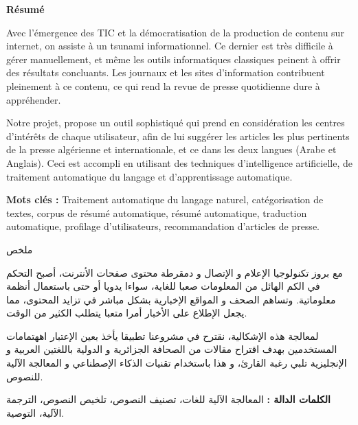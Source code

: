 \begin{center}
    \Large 
    \textbf{Résumé}
\end{center}

Avec l'émergence des TIC et la démocratisation de la production de contenu sur internet, on assiste à un tsunami informationnel. Ce dernier est très difficile à gérer manuellement, et même les outils informatiques classiques peinent à offrir des résultats concluants. Les journaux et les sites d'information contribuent pleinement à ce contenu, ce qui rend la revue de presse quotidienne dure à appréhender. 

Notre projet, propose un outil sophistiqué qui prend en considération les centres d’intérêts de chaque utilisateur, afin de lui suggérer les articles les plus pertinents de la presse algérienne et internationale, et ce dans les deux langues (Arabe et Anglais). Ceci est accompli en utilisant des techniques d'intelligence artificielle, de traitement automatique du langage et d'apprentissage automatique. 

\noindent
\textbf{Mots clés :} Traitement automatique du langage naturel, catégorisation de textes, corpus de résumé
automatique, résumé automatique, traduction automatique, profilage d'utilisateurs, recommandation d'articles de presse.  

\vspace*{0.8cm}

\begin{center}
    \Large 
    \begin{arab}
    ملخص
    \end{arab}
\end{center}
\begin{arab}
مع بروز تكنولوجيا الإعلام و الإتصال و دمقرطة محتوى صفحات الأنترنت، أصبح التحكم في الكم الهائل من المعلومات صعبا للغاية، سواءا يدويا أو حتى باستعمال أنظمة معلوماتية. وتساهم الصحف و المواقع الإخبارية بشكل مباشر في تزايد المحتوى، مما يجعل الإطلاع على الأخبار أمرا متعبا يتطلب الكثير من الوقت. 

لمعالجة هذه الإشكالية، نقترح في مشروعنا تطبيقا يأخذ بعين الإعتبار اههتمامات المستخدمين بهدف اقتراح مقالات من الصحافة الجزائرية و الدولية باللغتين العربية و الإنجليزية تلبي رغبة القارئ، و هذا باستخدام تقنيات الذكاء الإصطناعي و المعالجة الآلية للنصوص.

\textbf{الكلمات الدالة :} المعالجة الآلية للغات،  تصنيف النصوص، تلخيص النصوص، الترجمة الآلية، التوصية.  
\end{arab}

\vspace*{0.8cm}


